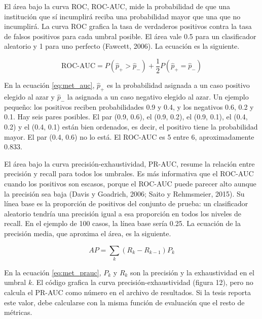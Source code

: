 El área bajo la curva ROC, ROC-AUC, mide la probabilidad de que una institución que sí incumplirá reciba una probabilidad mayor que una que no incumplirá. La curva ROC grafica la tasa de verdaderos positivos contra la tasa de falsos positivos para cada umbral posible. El área vale 0.5 para un clasificador aleatorio y 1 para uno perfecto (Fawcett, 2006). La ecuación es la siguiente.

\begin{equation}
\label{eq:met_auc}
\text{ROC-AUC} = P\left(\hat{p}_{+} > \hat{p}_{-}\right) + \frac{1}{2}P\left(\hat{p}_{+} = \hat{p}_{-}\right)
\end{equation}

En la ecuación \eqref{eq:met_auc}, $\hat{p}_{+}$ es la probabilidad asignada a un caso positivo elegido al azar y $\hat{p}_{-}$ la asignada a un caso negativo elegido al azar. Un ejemplo pequeño: los positivos reciben probabilidades 0.9 y 0.4, y los negativos 0.6, 0.2 y 0.1. Hay seis pares posibles. El par (0.9, 0.6), el (0.9, 0.2), el (0.9, 0.1), el (0.4, 0.2) y el (0.4, 0.1) están bien ordenados, es decir, el positivo tiene la probabilidad mayor. El par (0.4, 0.6) no lo está. El ROC-AUC es 5 entre 6, aproximadamente 0.833.

El área bajo la curva precisión-exhaustividad, PR-AUC, resume la relación entre precisión y recall para todos los umbrales. Es más informativa que el ROC-AUC cuando los positivos son escasos, porque el ROC-AUC puede parecer alto aunque la precisión sea baja (Davis y Goadrich, 2006; Saito y Rehmsmeier, 2015). Su línea base es la proporción de positivos del conjunto de prueba: un clasificador aleatorio tendría una precisión igual a esa proporción en todos los niveles de recall. En el ejemplo de 100 casos, la línea base sería 0.25. La ecuación de la precisión media, que aproxima el área, es la siguiente.

\begin{equation}
\label{eq:met_prauc}
AP = \sum_{k}\left(R_k - R_{k-1}\right)P_k
\end{equation}

En la ecuación \eqref{eq:met_prauc}, $P_k$ y $R_k$ son la precisión y la exhaustividad en el umbral $k$. El código grafica la curva precisión-exhaustividad (figura 12), pero no calcula el PR-AUC como número en el archivo de resultados. Si la tesis reporta este valor, debe calcularse con la misma función de evaluación que el resto de métricas. %

